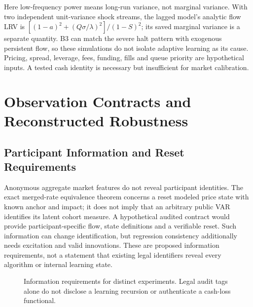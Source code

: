 Here low-frequency power means long-run variance, not marginal variance. With two independent unit-variance shock streams, the lagged model's analytic flow LRV is $[(1-a)^2+(Q\sigma/\lambda)^2]/(1-S)^2$; its saved marginal variance is a separate quantity. B3 can match the severe halt pattern with exogenous persistent flow, so these simulations do not isolate adaptive learning as its cause. Pricing, spread, leverage, fees, funding, fills and queue priority are hypothetical inputs. A tested cash identity is necessary but insufficient for market calibration.

\section{Observation Contracts and Reconstructed Robustness}
\label{sec:surveillance}
\subsection{Participant Information and Reset Requirements}
Anonymous aggregate market features do not reveal participant identities. The exact merged-rate equivalence theorem concerns a reset modeled price state with known anchor and impact; it does not imply that an arbitrary public VAR identifies its latent cohort measure. A hypothetical audited contract would provide participant-specific flow, state definitions and a verifiable reset. Such information can change identification, but regression consistency additionally needs excitation and valid innovations. These are proposed information requirements, not a statement that existing legal identifiers reveal every algorithm or internal learning state.

\begin{figure}[htbp]\centering
{}
\caption{Information requirements for distinct experiments. Legal audit tags alone do not disclose a learning recursion or authenticate a cash-loss functional.}
\label{fig:surveillance_contracts}\end{figure}

